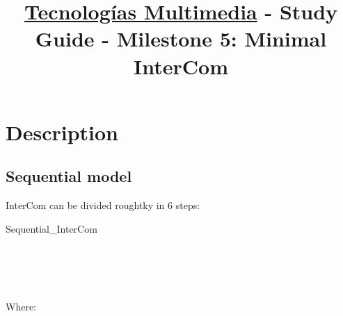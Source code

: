 \title{\href{https://www.ual.es/estudios/grados/presentacion/plandeestudios/asignatura/4015/40154321?idioma=zh_CN}{Tecnologías Multimedia} - Study Guide - Milestone 5: Minimal InterCom}

\maketitle

\section{Description}

\subsection{Sequential model}

InterCom can be divided roughtky in 6 steps:

\begin{pseudocode}{Sequential\_InterCom}{~}
  \BEGIN
     \GETS {}\\
     \GETS {}\\
    \\
     \GETS {}\\
     \GETS {}\\
  \END
  \ENDPROCEDURE
\end{pseudocode}

Where:

